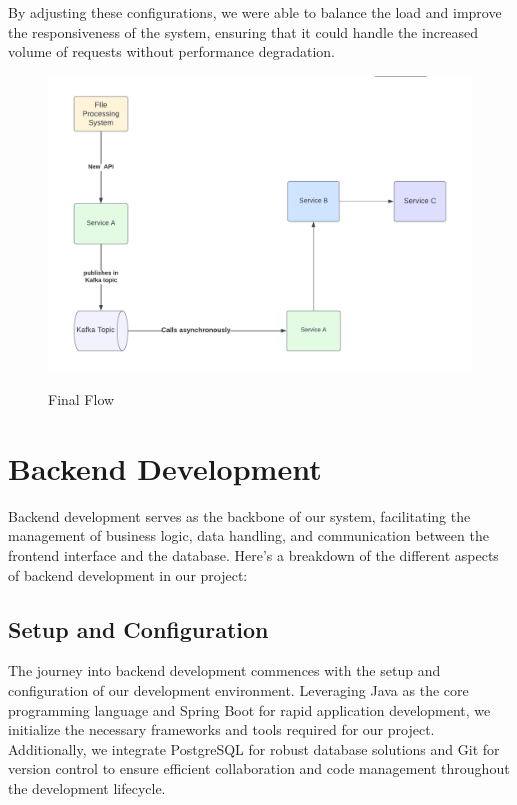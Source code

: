 \documentclass[12pt,a4paper]{report}
\begin{document}
By adjusting these configurations, we were able to balance the load and improve the responsiveness of the system, ensuring that it could handle the increased volume of requests without performance degradation.

\begin{figure}[h]
  \centering
  \includegraphics[width=5.5in]{final flow1.png}\\[1.5cm]
  \caption{Final Flow}
  \label{fig:example}
\end{figure}


\section{Backend Development}

Backend development serves as the backbone of our system, facilitating the management of business logic, data handling, and communication between the frontend interface and the database. Here's a breakdown of the different aspects of backend development in our project:

\subsection{Setup and Configuration}

The journey into backend development commences with the setup and configuration of our development environment. Leveraging Java as the core programming language and Spring Boot for rapid application development, we initialize the necessary frameworks and tools required for our project. Additionally, we integrate PostgreSQL for robust database solutions and Git for version control to ensure efficient collaboration and code management throughout the development lifecycle.
\end{document}
